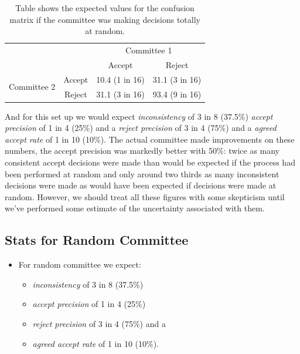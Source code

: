 \begin{table}[htb]
\caption{Table shows the expected values for the confusion matrix if the committee was making decisions totally at random.}
\label{table-random-committee}
\centering


  \begin{tabular}{lc|c|c|}
  & & \multicolumn{2}{c}{Committee 1} \\
  & & Accept & Reject \\ \hline
  \multirow{2}{*}{Committee 2} & Accept & 10.4 (1 in 16) & 31.1 (3 in 16) \\ 
  & Reject & 31.1 (3 in 16) & 93.4 (9 in 16)
  \end{tabular}
\end{table}

And for this set up we would expect \emph{inconsistency} of 3 in 8
(37.5\%) \emph{accept precision} of 1 in 4 (25\%) and a \emph{reject
precision} of 3 in 4 (75\%) and a \emph{agreed accept rate} of 1 in 10
(10\%). The actual committee made improvements on these numbers, the
accept precision was markedly better with 50\%: twice as many consistent
accept decisions were made than would be expected if the process had
been performed at random and only around two thirds as many inconsistent
decisions were made as would have been expected if decisions were made
at random. However, we should treat all these figures with some
skepticism until we've performed some estimate of the uncertainty
associated with them.

\subsection{Stats for Random
Committee}\label{stats-for-random-committee}

\begin{itemize}
\tightlist
\item
  For random committee we expect:

  \begin{itemize}
  \tightlist
  \item
    \emph{inconsistency} of 3 in 8 (37.5\%)
  \item
    \emph{accept precision} of 1 in 4 (25\%)
  \item
    \emph{reject precision} of 3 in 4 (75\%) and a
  \item
    \emph{agreed accept rate} of 1 in 10 (10\%).
  \end{itemize}
\end{itemize}

